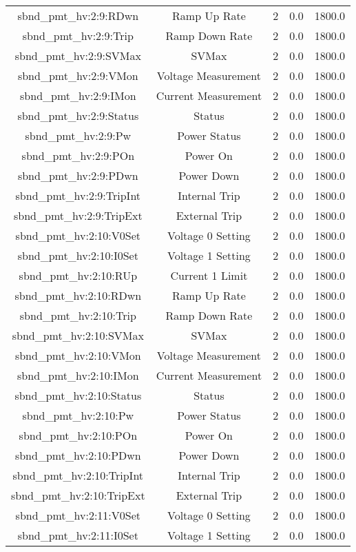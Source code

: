 \begin{table}[ptb]
\begin{tabular}{c | c c c c}
sbnd_pmt_hv:2:9:RDwn & Ramp Up Rate & 2 & 0.0 & 1800.0\\ 
sbnd_pmt_hv:2:9:Trip & Ramp Down Rate & 2 & 0.0 & 1800.0\\ 
sbnd_pmt_hv:2:9:SVMax & SVMax & 2 & 0.0 & 1800.0\\ 
sbnd_pmt_hv:2:9:VMon & Voltage Measurement & 2 & 0.0 & 1800.0\\ 
sbnd_pmt_hv:2:9:IMon & Current Measurement & 2 & 0.0 & 1800.0\\ 
sbnd_pmt_hv:2:9:Status & Status & 2 & 0.0 & 1800.0\\ 
sbnd_pmt_hv:2:9:Pw & Power Status & 2 & 0.0 & 1800.0\\ 
sbnd_pmt_hv:2:9:POn & Power On & 2 & 0.0 & 1800.0\\ 
sbnd_pmt_hv:2:9:PDwn & Power Down & 2 & 0.0 & 1800.0\\ 
sbnd_pmt_hv:2:9:TripInt & Internal Trip & 2 & 0.0 & 1800.0\\ 
sbnd_pmt_hv:2:9:TripExt & External Trip & 2 & 0.0 & 1800.0\\ 
sbnd_pmt_hv:2:10:V0Set & Voltage 0 Setting & 2 & 0.0 & 1800.0\\ 
sbnd_pmt_hv:2:10:I0Set & Voltage 1 Setting & 2 & 0.0 & 1800.0\\ 
sbnd_pmt_hv:2:10:RUp & Current 1 Limit & 2 & 0.0 & 1800.0\\ 
sbnd_pmt_hv:2:10:RDwn & Ramp Up Rate & 2 & 0.0 & 1800.0\\ 
sbnd_pmt_hv:2:10:Trip & Ramp Down Rate & 2 & 0.0 & 1800.0\\ 
sbnd_pmt_hv:2:10:SVMax & SVMax & 2 & 0.0 & 1800.0\\ 
sbnd_pmt_hv:2:10:VMon & Voltage Measurement & 2 & 0.0 & 1800.0\\ 
sbnd_pmt_hv:2:10:IMon & Current Measurement & 2 & 0.0 & 1800.0\\ 
sbnd_pmt_hv:2:10:Status & Status & 2 & 0.0 & 1800.0\\ 
sbnd_pmt_hv:2:10:Pw & Power Status & 2 & 0.0 & 1800.0\\ 
sbnd_pmt_hv:2:10:POn & Power On & 2 & 0.0 & 1800.0\\ 
sbnd_pmt_hv:2:10:PDwn & Power Down & 2 & 0.0 & 1800.0\\ 
sbnd_pmt_hv:2:10:TripInt & Internal Trip & 2 & 0.0 & 1800.0\\ 
sbnd_pmt_hv:2:10:TripExt & External Trip & 2 & 0.0 & 1800.0\\ 
sbnd_pmt_hv:2:11:V0Set & Voltage 0 Setting & 2 & 0.0 & 1800.0\\ 
sbnd_pmt_hv:2:11:I0Set & Voltage 1 Setting & 2 & 0.0 & 1800.0\\ 

\end{tabular}
\end{table}
